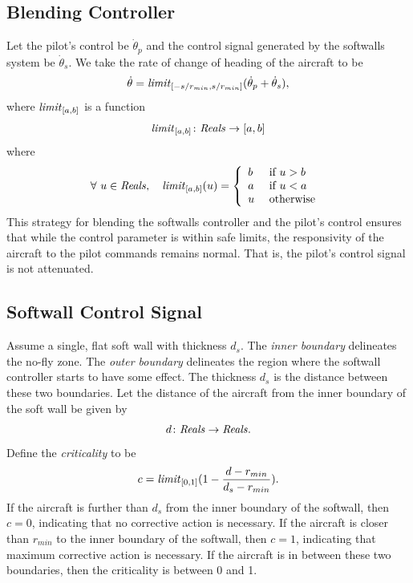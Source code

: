 \documentclass[11pt]{article}
\begin{document}
\subsection{Blending Controller}

Let the pilot's control be $\dot{\theta}_p$ and the control signal
generated by the softwalls system be $\dot{\theta}_s$.
We take the rate of change of heading of the aircraft to
be
\[
\dot{\theta} = \mbox{\textit{limit}}_{[-s/r_{min}, s/r_{min}]}
(\dot{\theta}_p + \dot{\theta}_s ),
\]
where $\mbox{\textit{limit}}_{[a,b]}$ is a function
\[
\mbox{\textit{limit}}_{[a,b]} \colon \mbox{\textit{Reals}} \to [a, b]
\]
where
\[
\forall ~ u \in \mbox{\textit{Reals}}, \quad
\mbox{\textit{limit}}_{[a,b]}(u) = \left \{
\begin{array}{ll}
b&\mbox{ if } u > b\\
a&\mbox{ if } u < a\\
u&\mbox{ otherwise }
\end{array}
\right .
\]
This strategy for blending the softwalls controller and the
pilot's control ensures that while the control parameter is within
safe limits, the responsivity of the aircraft to the pilot
commands remains normal.
That is, the pilot's control signal is not attenuated.

\subsection{Softwall Control Signal}

Assume a single, flat soft wall with thickness $d_s$.
The \textit{inner boundary} delineates the no-fly zone.
The \textit{outer boundary} delineates the region where the
softwall controller starts to have some effect.
The thickness $d_s$ is the distance between these two boundaries.
Let the distance of the aircraft from the inner boundary of
the soft wall be given by
\[
d \colon \mbox{\textit{Reals}} \to \mbox{\textit{Reals}} .
\]
Define the \textit{criticality} to be
\[
c = \mbox{\textit{limit}}_{[0,1]}(1 - {{d - r_{min}}\over{d_s - r_{min}}}) .
\]
If the aircraft is further than $d_s$ from the inner boundary of the
softwall, then $c = 0$, indicating that no corrective action is necessary.
If the aircraft is closer than $r_{min}$ to the inner boundary of the softwall,
then $c = 1$, indicating that maximum corrective action is necessary.
If the aircraft is in between these two boundaries, then the criticality
is between 0 and 1.
\end{document}
